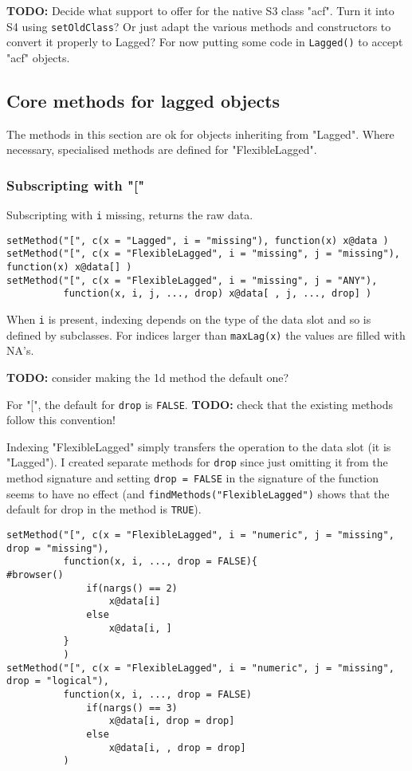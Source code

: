 \documentclass[11pt,a4paper]{article}
\begin{document}
\textbf{TODO:} Decide what support to offer for the native S3 class "acf". Turn it into S4 using
\texttt{setOldClass}? Or just adapt the various methods and constructors to convert it properly to
Lagged? For now putting some code in \texttt{Lagged()} to accept "acf" objects.

\subsection{Core methods for lagged objects}
\label{sec:org5157877}

The methods in this section are ok for objects inheriting from "Lagged". Where
necessary, specialised methods are defined for "FlexibleLagged".


\subsubsection{Subscripting with "["}
\label{sec:org677e7b4}

Subscripting with \texttt{i} missing, returns the raw data.
\begin{verbatim}
setMethod("[", c(x = "Lagged", i = "missing"), function(x) x@data )
setMethod("[", c(x = "FlexibleLagged", i = "missing", j = "missing"), function(x) x@data[] )
setMethod("[", c(x = "FlexibleLagged", i = "missing", j = "ANY"), 
          function(x, i, j, ..., drop) x@data[ , j, ..., drop] )
\end{verbatim}

When \texttt{i} is present, indexing depends on the type of the data slot and so is defined by
subclasses. For indices larger than \texttt{maxLag(x)} the values are filled with NA's.


\textbf{TODO:} consider making the 1d method the default one?

For "[", the default for \texttt{drop} is \texttt{FALSE}.
\textbf{TODO:} check that the existing methods follow this convention!

Indexing "FlexibleLagged" simply transfers the operation to the data slot (it is "Lagged").
I created separate methods for \texttt{drop} since just omitting it from the method signature and setting
\texttt{drop = FALSE} in the signature of the function seems to have no effect (and
\texttt{findMethods("FlexibleLagged")} shows that the default for drop in the method is \texttt{TRUE}).
\begin{verbatim}
setMethod("[", c(x = "FlexibleLagged", i = "numeric", j = "missing", drop = "missing"), 
          function(x, i, ..., drop = FALSE){
#browser()
              if(nargs() == 2)
                  x@data[i] 
              else
                  x@data[i, ] 
          }
          )
setMethod("[", c(x = "FlexibleLagged", i = "numeric", j = "missing", drop = "logical"), 
          function(x, i, ..., drop = FALSE)
              if(nargs() == 3)
                  x@data[i, drop = drop] 
              else
                  x@data[i, , drop = drop] 
          )
\end{verbatim}
\end{document}
